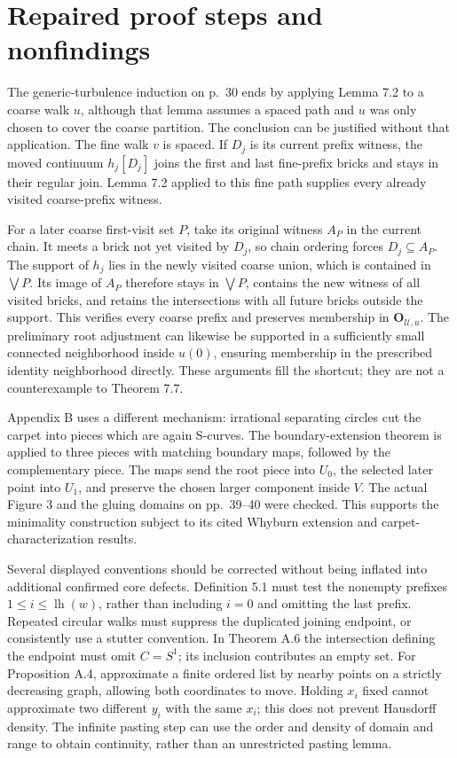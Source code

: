 \documentclass[10pt]{article}
\begin{document}
\section*{Repaired proof steps and nonfindings}
The generic-turbulence induction on p. 30 ends by applying Lemma 7.2 to a coarse walk \(u\), although that lemma assumes a spaced path and \(u\) was only chosen to cover the coarse partition. The conclusion can be justified without that application. The fine walk \(v\) is spaced. If \(D_j\) is its current prefix witness, the moved continuum \(h_j[D_j]\) joins the first and last fine-prefix bricks and stays in their regular join. Lemma 7.2 applied to this fine path supplies every already visited coarse-prefix witness.\par
For a later coarse first-visit set \(P\), take its original witness \(A_P\) in the current chain. It meets a brick not yet visited by \(D_j\), so chain ordering forces \(D_j\subseteq A_P\). The support of \(h_j\) lies in the newly visited coarse union, which is contained in \(\bigvee P\). Its image of \(A_P\) therefore stays in \(\bigvee P\), contains the new witness of all visited bricks, and retains the intersections with all future bricks outside the support. This verifies every coarse prefix and preserves membership in \(\mathbf O_{\mathcal U,u}\). The preliminary root adjustment can likewise be supported in a sufficiently small connected neighborhood inside \(u(0)\), ensuring membership in the prescribed identity neighborhood directly. These arguments fill the shortcut; they are not a counterexample to Theorem 7.7.\par
Appendix B uses a different mechanism: irrational separating circles cut the carpet into pieces which are again S-curves. The boundary-extension theorem is applied to three pieces with matching boundary maps, followed by the complementary piece. The maps send the root piece into \(U_0\), the selected later point into \(U_1\), and preserve the chosen larger component inside \(V\). The actual Figure 3 and the gluing domains on pp. 39–40 were checked. This supports the minimality construction subject to its cited Whyburn extension and carpet-characterization results.\par
Several displayed conventions should be corrected without being inflated into additional confirmed core defects. Definition 5.1 must test the nonempty prefixes \(1\leq i\leq\operatorname{lh}(w)\), rather than including \(i=0\) and omitting the last prefix. Repeated circular walks must suppress the duplicated joining endpoint, or consistently use a stutter convention. In Theorem A.6 the intersection defining the endpoint must omit \(C=S^1\); its inclusion contributes an empty set. For Proposition A.4, approximate a finite ordered list by nearby points on a strictly decreasing graph, allowing both coordinates to move. Holding \(x_i\) fixed cannot approximate two different \(y_i\) with the same \(x_i\); this does not prevent Hausdorff density. The infinite pasting step can use the order and density of domain and range to obtain continuity, rather than an unrestricted pasting lemma.\par
\end{document}
